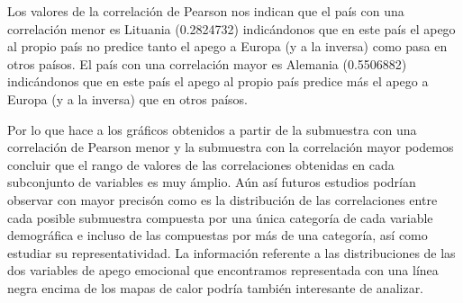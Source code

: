 \documentclass{article}
\begin{document}
\noindent Los valores de la correlación de Pearson nos indican que el país con una correlación menor es Lituania (0.2824732) indicándonos que en este país el apego al propio país no predice tanto el apego a Europa (y a la inversa) como pasa en otros paísos. El país con una correlación mayor es Alemania (0.5506882) indicándonos que en este país el apego al propio país predice más el apego a Europa (y a la inversa) que en otros paísos.


\noindent Por lo que hace a los gráficos obtenidos a partir de la submuestra con una correlación de Pearson menor y la submuestra con la correlación mayor podemos concluir que el rango de valores de las correlaciones obtenidas en cada subconjunto de variables es muy ámplio. Aún así futuros estudios podrían observar con mayor precisón como es la distribución de las correlaciones entre cada posible submuestra compuesta por una única categoría de cada variable demográfica e incluso de las compuestas por más de una categoría, así como estudiar su representatividad. La información referente a las distribuciones de las dos variables de apego emocional que encontramos representada con una línea negra encima de los mapas de calor podría también interesante de analizar.
\end{document}
